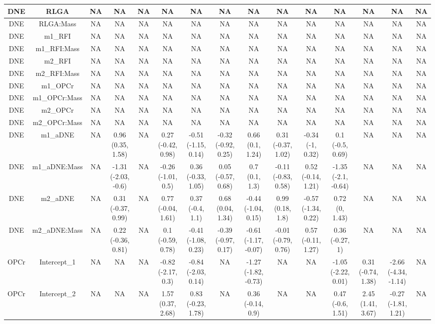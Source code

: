\begin{longtable}[t]{c|c|c|c|c|c|c|c|c|c|c|c|c|c|c}
\hline
DNE & RLGA & NA & NA & NA & NA & NA & NA & NA & NA & NA & NA & NA & NA & NA\\
\hline
DNE & RLGA:Mass & NA & NA & NA & NA & NA & NA & NA & NA & NA & NA & NA & NA & NA\\
\hline
DNE & m1_RFI & NA & NA & NA & NA & NA & NA & NA & NA & NA & NA & NA & NA & NA\\
\hline
DNE & m1_RFI:Mass & NA & NA & NA & NA & NA & NA & NA & NA & NA & NA & NA & NA & NA\\
\hline
DNE & m2_RFI & NA & NA & NA & NA & NA & NA & NA & NA & NA & NA & NA & NA & NA\\
\hline
DNE & m2_RFI:Mass & NA & NA & NA & NA & NA & NA & NA & NA & NA & NA & NA & NA & NA\\
\hline
DNE & m1_OPCr & NA & NA & NA & NA & NA & NA & NA & NA & NA & NA & NA & NA & NA\\
\hline
DNE & m1_OPCr:Mass & NA & NA & NA & NA & NA & NA & NA & NA & NA & NA & NA & NA & NA\\
\hline
DNE & m2_OPCr & NA & NA & NA & NA & NA & NA & NA & NA & NA & NA & NA & NA & NA\\
\hline
DNE & m2_OPCr:Mass & NA & NA & NA & NA & NA & NA & NA & NA & NA & NA & NA & NA & NA\\
\hline
DNE & m1_aDNE & NA & 0.96 (0.35, 1.58) & NA & 0.27 (-0.42, 0.98) & -0.51 (-1.15, 0.14) & -0.32 (-0.92, 0.25) & 0.66 (0.1, 1.24) & 0.31 (-0.37, 1.02) & -0.34 (-1, 0.32) & 0.1 (-0.5, 0.69) & NA & NA & NA\\
\hline
DNE & m1_aDNE:Mass & NA & -1.31 (-2.03, -0.6) & NA & -0.26 (-1.01, 0.5) & 0.36 (-0.33, 1.05) & 0.05 (-0.57, 0.68) & 0.7 (0.1, 1.3) & -0.11 (-0.83, 0.58) & 0.52 (-0.14, 1.21) & -1.35 (-2.1, -0.64) & NA & NA & NA\\
\hline
DNE & m2_aDNE & NA & 0.31 (-0.37, 0.99) & NA & 0.77 (-0.04, 1.61) & 0.37 (-0.4, 1.1) & 0.68 (0.04, 1.34) & -0.44 (-1.04, 0.15) & 0.99 (0.18, 1.8) & -0.57 (-1.34, 0.22) & 0.72 (0, 1.43) & NA & NA & NA\\
\hline
DNE & m2_aDNE:Mass & NA & 0.22 (-0.36, 0.81) & NA & 0.1 (-0.59, 0.78) & -0.41 (-1.08, 0.23) & -0.39 (-0.97, 0.17) & -0.61 (-1.17, -0.07) & -0.01 (-0.79, 0.76) & 0.57 (-0.11, 1.27) & 0.36 (-0.27, 1) & NA & NA & NA\\
\hline
OPCr & Intercept_1 & NA & NA & NA & -0.82 (-2.17, 0.3) & -0.84 (-2.03, 0.14) & NA & -1.27 (-1.82, -0.73) & NA & NA & -1.05 (-2.22, 0.01) & 0.31 (-0.74, 1.38) & -2.66 (-4.34, -1.14) & NA\\
\hline
OPCr & Intercept_2 & NA & NA & NA & 1.57 (0.37, 2.68) & 0.83 (-0.23, 1.78) & NA & 0.36 (-0.14, 0.9) & NA & NA & 0.47 (-0.6, 1.51) & 2.45 (1.41, 3.67) & -0.27 (-1.81, 1.21) & NA\\

\end{longtable}
